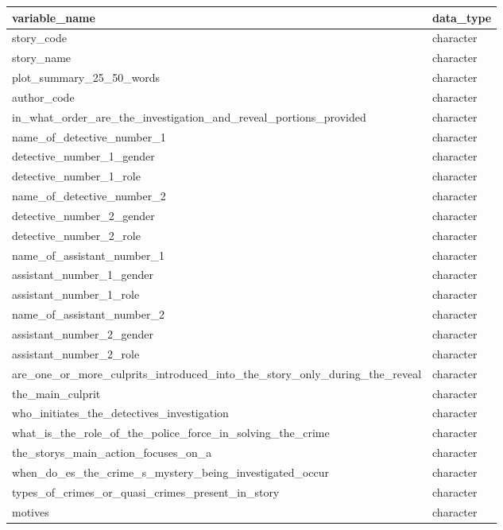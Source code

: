 \documentclass[
]{article}
\begin{document}
\begin{tabu} to 
\hline
variable\_name & data\_type\\
\hline
story\_code & character\\
\hline
story\_name & character\\
\hline
plot\_summary\_25\_50\_words & character\\
\hline
author\_code & character\\
\hline
in\_what\_order\_are\_the\_investigation\_and\_reveal\_portions\_provided & character\\
\hline
name\_of\_detective\_number\_1 & character\\
\hline
detective\_number\_1\_gender & character\\
\hline
detective\_number\_1\_role & character\\
\hline
name\_of\_detective\_number\_2 & character\\
\hline
detective\_number\_2\_gender & character\\
\hline
detective\_number\_2\_role & character\\
\hline
name\_of\_assistant\_number\_1 & character\\
\hline
assistant\_number\_1\_gender & character\\
\hline
assistant\_number\_1\_role & character\\
\hline
name\_of\_assistant\_number\_2 & character\\
\hline
assistant\_number\_2\_gender & character\\
\hline
assistant\_number\_2\_role & character\\
\hline
are\_one\_or\_more\_culprits\_introduced\_into\_the\_story\_only\_during\_the\_reveal & character\\
\hline
the\_main\_culprit & character\\
\hline
who\_initiates\_the\_detectives\_investigation & character\\
\hline
what\_is\_the\_role\_of\_the\_police\_force\_in\_solving\_the\_crime & character\\
\hline
the\_storys\_main\_action\_focuses\_on\_a & character\\
\hline
when\_do\_es\_the\_crime\_s\_mystery\_being\_investigated\_occur & character\\
\hline
types\_of\_crimes\_or\_quasi\_crimes\_present\_in\_story & character\\
\hline
motives & character\\

\end{tabu}
\end{document}

